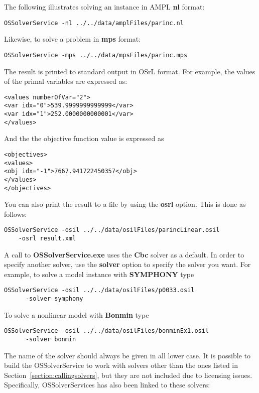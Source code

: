 \documentclass[11pt]{article}
\renewcommand{\_}{{\char"5F}}
\renewcommand{\{}{{\char"7B}}
\renewcommand{\}}{{\char"7D}}
\renewcommand{\^}{{\char"0D}}
\renewcommand{\'}{{\char"0D}}
\begin{document}
The following illustrates solving an instance in AMPL {\bf nl} format:

\begin{verbatim}
OSSolverService -nl ../../data/amplFiles/parinc.nl
\end{verbatim}

Likewise, to solve a problem in {\bf mps} format:

\begin{verbatim}
OSSolverService -mps ../../data/mpsFiles/parinc.mps
\end{verbatim}


The result is printed to standard output in OSrL format. For example, the values of the primal 
variables are expressed as:

\begin{verbatim}
<values numberOfVar="2">
<var idx="0">539.9999999999999</var>
<var idx="1">252.0000000000001</var>
</values>
\end{verbatim}
And the the objective function value is expressed as
\begin{verbatim}
<objectives>
<values>
<obj idx="-1">7667.941722450357</obj>
</values>
</objectives>
\end{verbatim}
You can also print the result to a file by using the {\bf osrl} option. This is done as follows:
{\small
\begin{verbatim}
OSSolverService -osil ../../data/osilFiles/parincLinear.osil 
    -osrl result.xml
\end{verbatim}
}


A call to {\bf OSSolverService.exe} uses the {\bf Cbc} solver as a default. In order to specify 
another solver, use  the {\bf solver} option to specify the solver you want. For example, 
to solve a model instance with {\bf SYMPHONY} type

{\small
\begin{verbatim}
OSSolverService -osil ../../data/osilFiles/p0033.osil 
      -solver symphony
\end{verbatim}
}
To solve a nonlinear model with {\bf Bonmin} type
{\small
\begin{verbatim}
OSSolverService -osil ../../data/osilFiles/bonminEx1.osil 
      -solver bonmin
\end{verbatim}
}
The name of the solver should always be given in all lower case.  It is possible to build the 
OSSolverService to work with solvers other than the ones listed in Section~\ref{section:callingsolvers},
but they are not included due to licensing issues. Specifically, OSSolverServices has also been linked
to these solvers:
\end{document}
